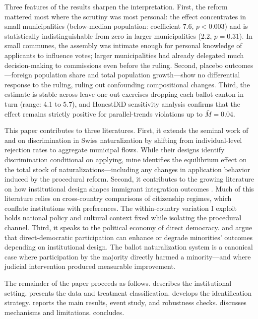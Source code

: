 \documentclass[12pt]{article}
\begin{document}
Three features of the results sharpen the interpretation. First, the reform mattered most where the scrutiny was most personal: the effect concentrates in small municipalities (below-median population: coefficient 7.6, $p < 0.003$) and is statistically indistinguishable from zero in larger municipalities (2.2, $p = 0.31$). In small communes, the assembly was intimate enough for personal knowledge of applicants to influence votes; larger municipalities had already delegated much decision-making to commissions even before the ruling. Second, placebo outcomes---foreign population share and total population growth---show no differential response to the ruling, ruling out confounding compositional changes. Third, the estimate is stable across leave-one-out exercises dropping each ballot canton in turn (range: 4.1 to 5.7), and HonestDiD sensitivity analysis \citep{rambachan2023} confirms that the effect remains strictly positive for parallel-trends violations up to $\bar{M} = 0.04$.

This paper contributes to three literatures. First, it extends the seminal work of \citet{hainmueller2013} and \citet{hainmueller2015} on discrimination in Swiss naturalization by shifting from individual-level rejection rates to aggregate municipal flows. While their designs identify discrimination conditional on applying, mine identifies the equilibrium effect on the total stock of naturalizations---including any changes in application behavior induced by the procedural reform. Second, it contributes to the growing literature on how institutional design shapes immigrant integration outcomes \citep{janoski2010, howard2009, vink2013, goodman2010}. Much of this literature relies on cross-country comparisons of citizenship regimes, which conflate institutions with preferences. The within-country variation I exploit holds national policy and cultural context fixed while isolating the procedural channel. Third, it speaks to the political economy of direct democracy. \citet{frey2006} and \citet{hangartner2019} argue that direct-democratic participation can enhance or degrade minorities' outcomes depending on institutional design. The ballot naturalization system is a canonical case where participation by the majority directly harmed a minority---and where judicial intervention produced measurable improvement.

The remainder of the paper proceeds as follows.  describes the institutional setting.  presents the data and treatment classification.  develops the identification strategy.  reports the main results, event study, and robustness checks.  discusses mechanisms and limitations.  concludes.
\end{document}
